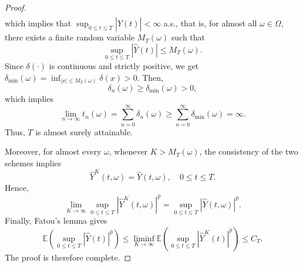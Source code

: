 \documentclass[preprint,12pt,compress]{elsarticle}
\begin{document}
\begin{proof}
\begin{equation*}
\begin{split}
\end{split}
\end{equation*}
which implies that ${\sup _{0 \le t \le T}}| {\hat Y(t)}| < \infty $ a.s., that is, for almost all $\omega \in \Omega$, there exists a finite random variable $M_T(\omega)$ such that
\begin{equation}  \label{a14}
	\mathop {\sup }\limits_{0 \le t \le T} \left| {\hat Y(t)} \right| \le M_T(\omega ) .
\end{equation}
Since $\delta ( \cdot )$ is continuous and strictly positive, we get ${\delta _{\min }} (\omega ) = {\inf _{|x| \le M_T(\omega )}}\delta (x) > 0$. Then, 
\begin{equation*}
	{\delta _n}(\omega ) \ge {\delta _{\min }}(\omega ) > 0 ,
\end{equation*}
which implies
\begin{equation*}
	\mathop {\lim }\limits_{n \to \infty } {t_n}(\omega ) = \sum\limits_{n = 0}^\infty  {{\delta _n}(\omega )}  \ge \sum\limits_{n = 0}^\infty  {{\delta _{\min }}(\omega )}  = \infty .
\end{equation*}
Thus, $T$ is almost surely attainable.

Moreover, for almost every $\omega$, whenever $K > M_T(\omega)$, the consistency of the two schemes implies
\begin{equation*}
	{{\hat Y}^K}(t,\omega ) = \hat Y(t,\omega ), \quad 0 \le t \le T.
\end{equation*}
Hence,
\begin{equation*}
	\mathop {\lim }\limits_{K \to \infty } \mathop {\sup }\limits_{0 \le t \le T} {\left| {{{\hat Y}^K}(t,\omega )} \right|^{\bar p}} = \mathop {\sup }\limits_{0 \le t \le T} {\left| {\hat Y(t,\omega )} \right|^{\bar p}}.
\end{equation*}
Finally, Fatou's lemma gives
\begin{equation*}
	\mathbb{E}\left( {\mathop {\sup }\limits_{0 \le t \le T} {{\left| {\hat Y(t)} \right|}^{\bar p}}} \right) \le \mathop {\lim \inf }\limits_{K \to \infty } \mathbb{E}\left( {\mathop {\sup }\limits_{0 \le t \le T} {{\left| {{{\hat Y}^K}(t)} \right|}^{\bar p}}} \right) \le {C_T} .
\end{equation*}
The proof is therefore complete.
\end{proof}
\end{document}
